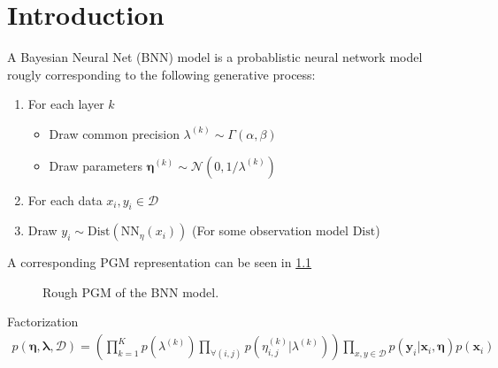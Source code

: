 \chapter{Introduction}

\blindtext[2]

A Bayesian Neural Net (BNN) model is a probablistic neural network model rougly corresponding to the following generative process:
\begin{enumerate}
    \item For each layer $k$
    \begin{itemize}
        \item Draw common precision $\lambda^{(k)}\sim \Gamma(\alpha, \beta)$
        \item Draw parameters $\bm\eta^{(k)} \sim \mathcal N(0, 1/\lambda^{(k)})$
    \end{itemize}
    \item For each data $x_i, y_i \in \mathcal D$
    \item Draw $y_i \sim \text{Dist}(\text{NN}_\eta(x_i))$ (For some observation model $\text{Dist}$)
\end{enumerate}
A corresponding PGM representation can be seen in \cref{fig:bnn-pgm} 
\begin{figure}[htbp]
    \centering
    \caption{Rough PGM of the BNN model.}
    \label{fig:bnn-pgm}
\end{figure}

Factorization
\begin{align*}
    p(\bm \eta, \bm \lambda, \mathcal D) = \left(\prod_{k=1}^K  p(\lambda^{(k)}) \prod_{\forall (i,j)} p(\eta_{i,j}^{(k)}|\lambda^{(k)})  \right) 
    \prod_{x, y\in \mathcal D} p(\bm y_i | \bm x_i, \bm \eta) p(\bm x_i)
\end{align*}


